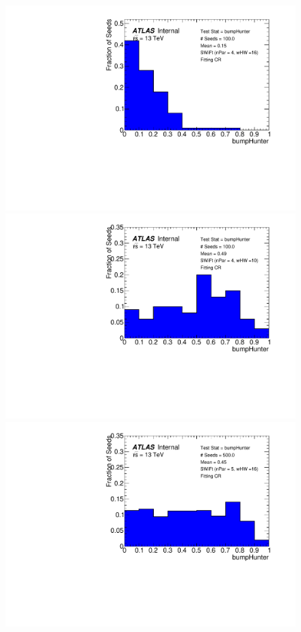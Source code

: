 \begin{figure}[!tb]
\captionsetup[subfigure]{aboveskip=0pt,justification=centering}
\centering
{} {
  \includegraphics[width=0.45\linewidth, angle=0]{figs/Dibjet/LowMass/FitStudy_min566/pVal_bumpHunter_corrFitCR_4para_low16_high16.pdf}
}                                                                                              
 {                                                    
  \includegraphics[width=0.45\linewidth, angle=0]{figs/Dibjet/LowMass/FitStudy_min566/pVal_bumpHunter_corrFitCR_4para_low10_high10.pdf}
}                                                                                              
 {                                                    
  \includegraphics[width=0.45\linewidth, angle=0]{figs/Dibjet/LowMass/FitStudy_min566/pVal_bumpHunter_corrFitCR_5para_low16_high16.pdf}
}
\end{figure}
